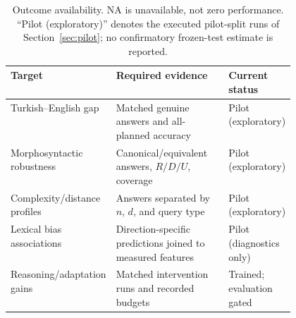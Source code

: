 \begin{table}[t]
  \centering
  \caption{Outcome availability. NA is unavailable, not zero performance. ``Pilot (exploratory)'' denotes
  the executed pilot-split runs of Section~\ref{sec:pilot}; no confirmatory frozen-test estimate is
  reported.}
  \label{tab:availability}
  \small
  \begin{tabular}{@{}lp{0.47\linewidth}l@{}}
    \toprule
    Target & Required evidence & Current status \\
    \midrule
    Turkish--English gap        & Matched genuine answers and all-planned accuracy        & Pilot (exploratory) \\
    Morphosyntactic robustness  & Canonical/equivalent answers, $R/D/U$, coverage          & Pilot (exploratory) \\
    Complexity/distance profiles & Answers separated by $n$, $d$, and query type           & Pilot (exploratory) \\
    Lexical bias associations   & Direction-specific predictions joined to measured features & Pilot (diagnostics only) \\
    Reasoning/adaptation gains  & Matched intervention runs and recorded budgets           & Trained; evaluation gated \\
    \bottomrule
  \end{tabular}
\end{table}
